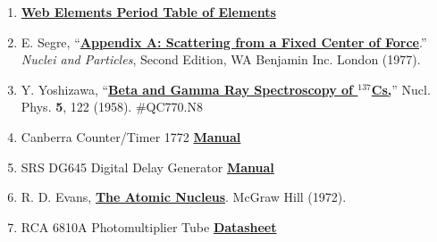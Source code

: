 \documentclass{../lab}
\begin{document}
\begin{enumerate}
    \item \href{http://www.webelements.com}{\textbf{Web Elements Period Table of Elements}}

    \item E. Segre, ``\href{https://drive.google.com/file/d/1OEWPggCYC7qlHG2dqvx14lR95Qbx-yOm/view?usp=drive_link}{\textbf{Appendix A: Scattering from a Fixed Center of Force}}.'' \emph{Nuclei and Particles}, Second Edition, WA Benjamin Inc. London (1977).
    
    \item Y. Yoshizawa, ``\href{https://drive.google.com/file/d/135YuieQsc88Iu5VaKTRbhwuVIIH8iUFo/view?usp=drive_link}{\textbf{Beta and Gamma Ray Spectroscopy of $^{137}$Cs,}}'' Nucl. Phys. {\textbf 5}, 122 (1958). \#QC770.N8
    
    \item Canberra Counter/Timer 1772 \href{https://drive.google.com/file/d/1x71VQ6Z8jm2gjv1pLQHUOzLaIu8dvqIA/view?usp=drive_link}{\textbf{Manual}}
    
    \item SRS DG645 Digital Delay Generator  \href{https://drive.google.com/file/d/1PNLeiZvP4k50RJv1V8cbh_L-T2n2zmKE/view?usp=drive_link}{\textbf{Manual}}
    
    \item R. D. Evans, \href{https://drive.google.com/file/d/1dHgK8gXV5EruHZoahXIMxdXk2cJ6jTod/view?usp=drive_link}{\textbf{The Atomic Nucleus}}. McGraw Hill (1972).
    
    \item RCA 6810A Photomultiplier Tube \href{https://drive.google.com/file/d/1iAtx9ldggR1MaUwRghCeHqJyUHIAPnxo/view?usp=drive_link}{\textbf{Datasheet}}
\end{enumerate}
\end{document}
